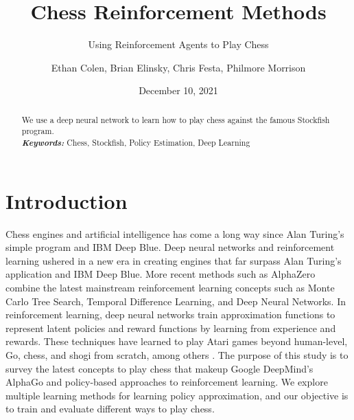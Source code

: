\documentclass[12pt]{turabian-researchpaper}
\title{Chess Reinforcement Methods}
\subtitle{Using Reinforcement Agents to Play Chess}
\author{Ethan Colen, Brian Elinsky, Chris Festa, Philmore Morrison}
\date{December 10, 2021}
\providecommand{\keywords}[1]{\textbf{\textit{Keywords:}} #1}
\begin{document}
\maketitle

\begin{abstract}
    \noindent
    We use a deep neural network to learn how to play chess against the famous Stockfish program.\\
\noindent\keywords{Chess, Stockfish, Policy Estimation, Deep Learning}
\end{abstract}

\section*{Introduction}


Chess engines and artificial intelligence has come a long way since Alan Turing’s simple program and IBM Deep Blue. Deep neural networks and reinforcement learning ushered in a new era in creating engines that far surpass Alan Turing’s application and IBM Deep Blue. More recent methods such as AlphaZero combine the latest mainstream reinforcement learning concepts such as Monte Carlo Tree Search, Temporal Difference Learning, and Deep Neural Networks. In reinforcement learning, deep neural networks train approximation functions to represent latent policies and reward functions by learning from experience and rewards. These techniques have learned to play Atari games beyond human-level, Go, chess, and shogi from scratch, among others \parencite{srinivasan_actor-critic_2018}. The purpose of this study is to survey the latest concepts to play chess that makeup Google DeepMind’s AlphaGo and policy-based approaches to reinforcement learning. We explore multiple learning methods for learning policy approximation, and our objective is to train and evaluate different ways to play chess.

\end{document}
